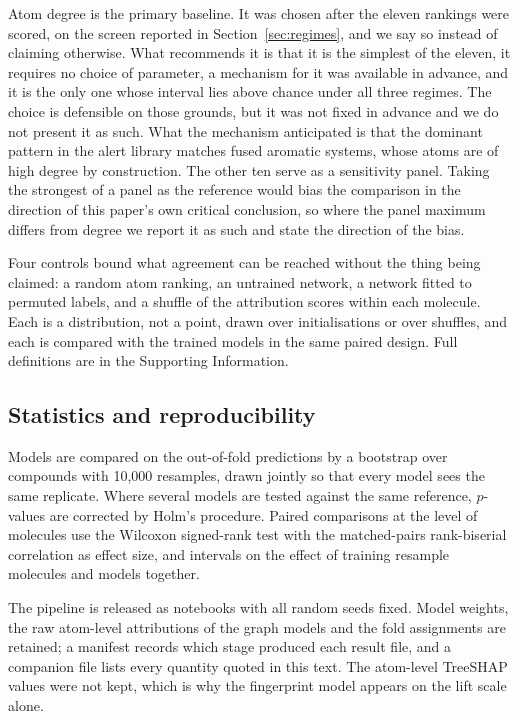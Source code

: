 \documentclass[journal=jcisd8,manuscript=article]{achemso}
\begin{document}
Atom degree is the primary baseline. It was chosen after the eleven rankings were scored, on
the screen reported in Section~\ref{sec:regimes}, and we say so instead of claiming otherwise. What recommends it is that it is the simplest of the eleven, it requires no choice
of parameter, a mechanism for it was available in advance, and it is the only one whose
interval lies above chance under all three regimes. The choice is defensible on those grounds,
but it was not fixed in advance and we do not present it as such. What the mechanism
anticipated is that the dominant pattern in the alert library matches fused aromatic systems,
whose atoms are of high degree by construction. The other ten serve as a sensitivity panel. Taking
the strongest of a panel as the reference would bias the comparison in the direction of this
paper's own critical conclusion, so where the panel maximum differs from degree we report it
as such and state the direction of the bias.


Four controls bound what agreement can be reached without the thing being claimed: a random
atom ranking, an untrained network, a network fitted to permuted labels, and a shuffle of the
attribution scores within each molecule. Each is a distribution, not a point, drawn
over initialisations or over shuffles, and each is compared with the trained models in the
same paired design. Full definitions are in the Supporting Information.

\subsection{Statistics and reproducibility}

Models are compared on the out-of-fold predictions by a bootstrap over compounds with 10,000
resamples, drawn jointly so that every model sees the same replicate. Where several models
are tested against the same reference, $p$-values are corrected by Holm's procedure. Paired
comparisons at the level of molecules use the Wilcoxon signed-rank test with the
matched-pairs rank-biserial correlation as effect size, and intervals on the effect of
training resample molecules and models together.


The pipeline is released as notebooks with all random seeds fixed. Model weights, the raw
atom-level attributions of the graph models and the fold assignments are retained; a manifest
records which stage produced each result file, and a companion file lists every quantity
quoted in this text. The atom-level TreeSHAP values were not kept, which is why the fingerprint
model appears on the lift scale alone.
\end{document}
